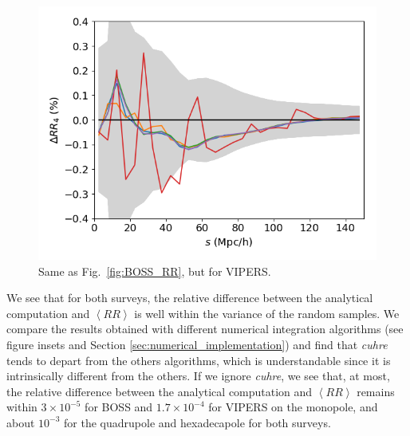 \documentclass{aa}
\begin{document}
\begin{figure}
\includegraphics[width=0.96\columnwidth]{Figures/reldif_RR_random_VIPERS_W1_nside65536_N_3900000_1e-5_l4.png} 
    \caption{Same as Fig.~\ref{fig:BOSS_RR}, but for VIPERS.}
    \label{fig:VIPERS_RR}
\end{figure}
%
We see that for both surveys, the relative difference between the analytical computation and $\left<RR\right>$ is well within the variance of the random samples. We compare the results obtained with different numerical integration algorithms (see figure insets and Section \ref{sec:numerical_implementation}) and find that \emph{cuhre} tends to depart from the others algorithms, which is understandable since it is intrinsically different from the others. 
If we ignore \emph{cuhre}, we see that, at most, the relative difference between the analytical computation and $\left<RR\right>$ remains within $3\times10^{-5}$ for BOSS and $1.7\times10^{-4}$ for VIPERS on the monopole, and about $10^{-3}$ for the quadrupole and hexadecapole for both surveys.
\end{document}
